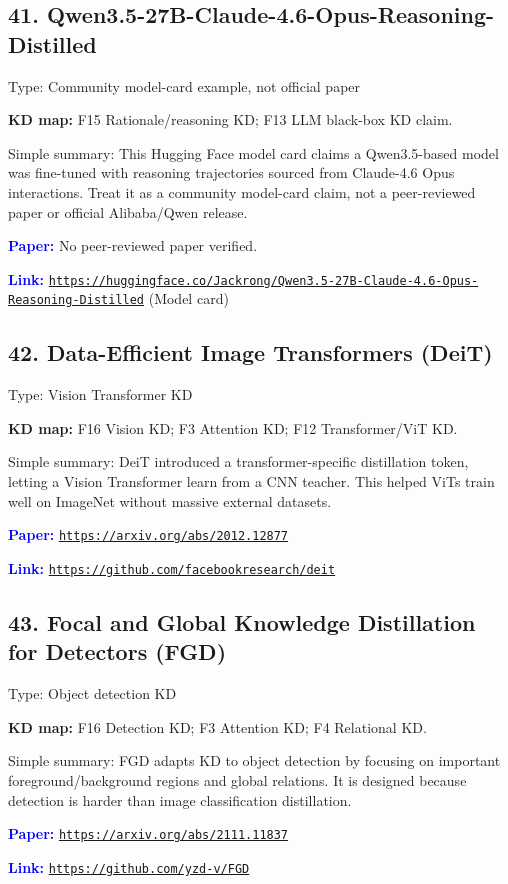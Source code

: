 \documentclass[10pt]{article}
\begin{document}
\subsection*{41. Qwen3.5-27B-Claude-4.6-Opus-Reasoning-Distilled}
Type: Community model-card example, not official paper\par
\textbf{KD map:} F15 Rationale/reasoning KD; F13 LLM black-box KD claim.\par
Simple summary: This Hugging Face model card claims a Qwen3.5-based model was fine-tuned with reasoning trajectories sourced from Claude-4.6 Opus interactions. Treat it as a community model-card claim, not a peer-reviewed paper or official Alibaba/Qwen release.\par
\textcolor{blue}{\textbf{Paper:}} No peer-reviewed paper verified.\par
\textcolor{blue}{\textbf{Link:}} \href{https://huggingface.co/Jackrong/Qwen3.5-27B-Claude-4.6-Opus-Reasoning-Distilled}{\nolinkurl{https://huggingface.co/Jackrong/Qwen3.5-27B-Claude-4.6-Opus-Reasoning-Distilled}} (Model card)\par

\subsection*{42. Data-Efficient Image Transformers (DeiT)}
Type: Vision Transformer KD\par
\textbf{KD map:} F16 Vision KD; F3 Attention KD; F12 Transformer/ViT KD.\par
Simple summary: DeiT introduced a transformer-specific distillation token, letting a Vision Transformer learn from a CNN teacher. This helped ViTs train well on ImageNet without massive external datasets.\par
\textcolor{blue}{\textbf{Paper:}} \href{https://arxiv.org/abs/2012.12877}{\nolinkurl{https://arxiv.org/abs/2012.12877}}\par
\textcolor{blue}{\textbf{Link:}} \href{https://github.com/facebookresearch/deit}{\nolinkurl{https://github.com/facebookresearch/deit}}\par

\subsection*{43. Focal and Global Knowledge Distillation for Detectors (FGD)}
Type: Object detection KD\par
\textbf{KD map:} F16 Detection KD; F3 Attention KD; F4 Relational KD.\par
Simple summary: FGD adapts KD to object detection by focusing on important foreground/background regions and global relations. It is designed because detection is harder than image classification distillation.\par
\textcolor{blue}{\textbf{Paper:}} \href{https://arxiv.org/abs/2111.11837}{\nolinkurl{https://arxiv.org/abs/2111.11837}}\par
\textcolor{blue}{\textbf{Link:}} \href{https://github.com/yzd-v/FGD}{\nolinkurl{https://github.com/yzd-v/FGD}}\par
\end{document}
